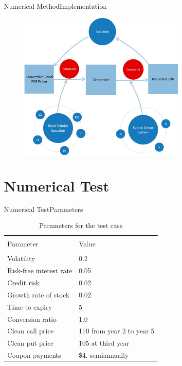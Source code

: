 \documentclass{beamer}
\begin{document}
\begin{frame}{Numerical Method}{Implementation}
	\begin{figure}
		\centering
		\includegraphics[width=0.75\textwidth]{Figures/Objects}
	\end{figure}
\end{frame}


\section{Numerical Test}

\begin{frame}{Numerical Test}{Parameters}

	\begin{table}
		\centering
		\begin{tabular}{ll}
		\hline\hline\\
		Parameter &  Value \\
		\hline\\
		Volatility & 0.2 \\
		Risk-free interest rate & 0.05\\
		Credit risk & 0.02\\
		Growth rate of stock & 0.02\\
		Time to expiry & 5 \\
		Conversion ratio & 1.0 \\
		Clean call price & 110 from year 2 to year 5\\
		Clean put price & 105 at third year\\
		Coupon payments & \$4, semiannually\\
		\hline
		\end{tabular}
		\caption{Parameters for the test case}
		\label{tb:params}
	\end{table}
	
\end{frame}
\end{document}
